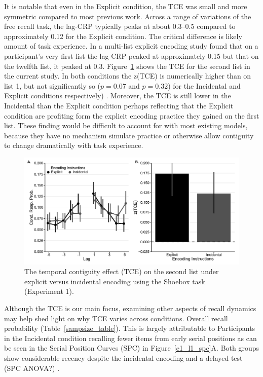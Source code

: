 \documentclass[man,natbib,floatsintext]{apa6} %
\begin{document}
\color{red}
\label{TODO-5}
It is notable that even in the Explicit condition, the TCE was small and more symmetric compared to most previous work. Across a range of variations of the free recall task, the lag-CRP typically peaks at about 0.3--0.5 \citep{HealKaha17} compared to approximately 0.12 for the Explicit condition. The critical difference is likely amount of task experience. In a multi-list explicit encoding study \citet{HealKaha17} found that on a participant's very first list the lag-CRP peaked at approximately 0.15 but that on the twelfth list, it peaked at 0.3. Figure~\ref{e1_l2_crp} shows the TCE for the second list in the current study. In both conditions the z(TCE) is numerically higher than on list 1, but not significantly so ($p=0.07$ and $p=0.32$) for the Incidental and Explicit conditions respectively) \label{t1}. Moreover, the TCE is still lower in the Incidental than the Explicit condition perhaps reflecting that the Explicit condition are profiting form the explicit encoding practice they gained on the first list. These finding would be difficult to account for with most existing models, because they have no mechanism simulate practice or otherwise allow contiguity to change dramatically with task experience.

\begin{figure}
\includegraphics{figures/E1_crp_list2.pdf}
\caption{The temporal contiguity effect (TCE) on the second list under explicit versus incidental encoding using the Shoebox task (Experiment 1). \paneltext}
\label{e1_l2_crp}
\end{figure}

\color{black}


\color{red}
\label{TODO-6}
Although the TCE is our main focus, \label{SPCtalk} examining other aspects of recall dynamics may help shed light on why TCE varies across conditions. Overall recall probability (Table~\ref{sampsize_table}). This is largely attributable to Participants in the Incidental condition recalling fewer items from early serial positions as can be seen in the Serial Position Curves (SPC) in Figure~\ref{e1_l1_spc}A. Both groups show considerable recency despite the incidental encoding and a delayed test (SPC ANOVA?) \citep[for a similar findings see][]{MarsWerd72,Neat93,GlenEtal80}.
\end{document}
